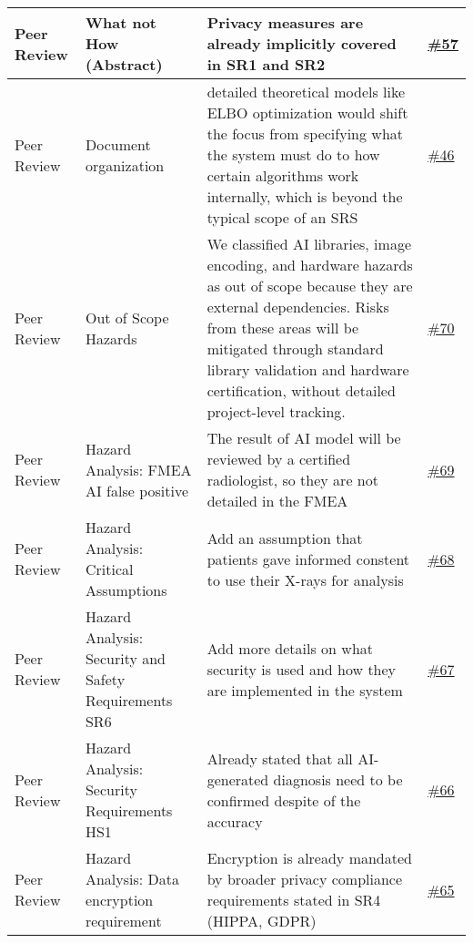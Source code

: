 \documentclass{article}
\begin{document}
\begin{longtable}{| p{} | p{} | p{} | p{} |}
    \hline
    Peer Review & What not How (Abstract) & Privacy measures are already implicitly covered in SR1 and SR2  & \href{https://github.com/RezaJodeiri/CXR-Capstone/issues/57}{\#57} \\
    \hline
    Peer Review & Document organization & detailed theoretical models like ELBO optimization would shift the focus from specifying what the system must do to how certain algorithms work internally, which is beyond the typical scope of an SRS  & \href{https://github.com/RezaJodeiri/CXR-Capstone/issues/46}{\#46} \\
    \hline
    Peer Review & Out of Scope Hazards & We classified AI libraries, image encoding, and hardware hazards as out of scope because they are external dependencies. Risks from these areas will be mitigated through standard library validation and hardware certification, without detailed project-level tracking. & \href{https://github.com/RezaJodeiri/CXR-Capstone/issues/70}{\#70}\\
    \hline 
    Peer Review & Hazard Analysis: FMEA AI false positive & The result of AI model will be reviewed by a certified radiologist,  so they are not detailed in the FMEA & \href{https://github.com/RezaJodeiri/CXR-Capstone/issues/69}{\#69}\\
    \hline
    Peer Review & Hazard Analysis: Critical Assumptions & Add an assumption that patients gave informed constent to use their X-rays for analysis & \href{https://github.com/RezaJodeiri/CXR-Capstone/issues/68}{\#68}\\
    \hline 
    Peer Review & Hazard Analysis: Security and Safety Requirements SR6 & Add more details on what security is used and how they are implemented in the system & \href{https://github.com/RezaJodeiri/CXR-Capstone/issues/67}{\#67}\\
    \hline
    Peer Review &  Hazard Analysis: Security Requirements HS1 & Already stated that all AI-generated diagnosis need to be confirmed despite of the accuracy & \href{https://github.com/RezaJodeiri/CXR-Capstone/issues/66}{\#66}\\
    \hline
    Peer Review & Hazard Analysis: Data encryption requirement & Encryption is already mandated by broader privacy compliance requirements stated in SR4 (HIPPA, GDPR) & \href{https://github.com/RezaJodeiri/CXR-Capstone/issues/65}{\#65}\\
    \hline
    
    

\end{longtable}
\end{document}
